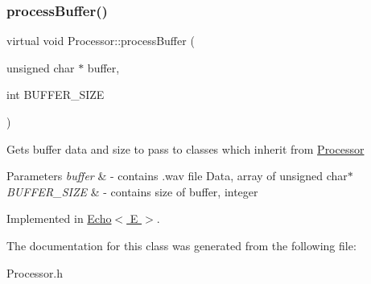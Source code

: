 \subsubsection{\texorpdfstring{process\+Buffer()}{processBuffer()}}
{\footnotesize\ttfamily virtual void Processor\+::process\+Buffer (\begin{DoxyParamCaption}\item[{unsigned char $\ast$}]{buffer,  }\item[{int}]{B\+U\+F\+F\+E\+R\+\_\+\+S\+I\+ZE }\end{DoxyParamCaption})\hspace{0.3cm}{\ttfamily [pure virtual]}}

Gets buffer data and size to pass to classes which inherit from \hyperlink{classProcessor}{Processor} 
\begin{DoxyParams}{Parameters}
{\em buffer} & -\/ contains .wav file Data, array of unsigned char$\ast$ \\
\hline
{\em B\+U\+F\+F\+E\+R\+\_\+\+S\+I\+ZE} & -\/ contains size of buffer, integer \\
\hline
\end{DoxyParams}


Implemented in \hyperlink{classEcho_a3e23a70d522b79ef1e5b9df90c2af183}{Echo$<$ E $>$}.



The documentation for this class was generated from the following file\+:\begin{DoxyCompactItemize}
\item 
Processor.\+h\end{DoxyCompactItemize}
